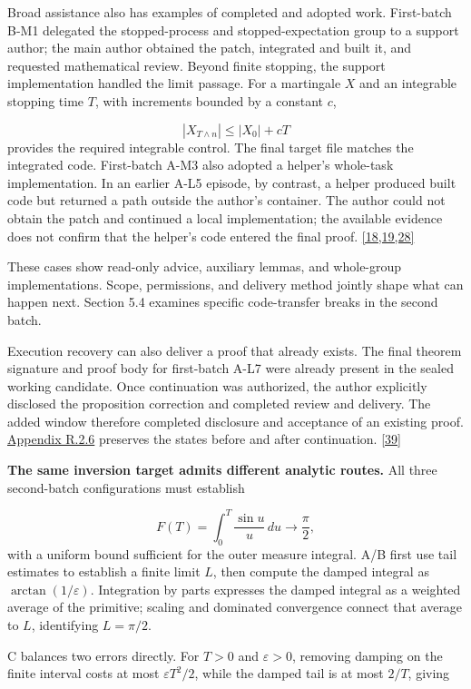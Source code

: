 Broad assistance also has examples of completed and adopted work. First-batch B-M1 delegated the stopped-process and stopped-expectation group to a support author; the main author obtained the patch, integrated and built it, and requested mathematical review. Beyond finite stopping, the support implementation handled the limit passage. For a martingale $X$ and an integrable stopping time $T$, with increments bounded by a constant $c$,

\[
|X_{T\wedge n}|\leq |X_0|+cT
\]
provides the required integrable control. The final target file matches the integrated code. First-batch A-M3 also adopted a helper's whole-task implementation. In an earlier A-L5 episode, by contrast, a helper produced built code but returned a path outside the author's container. The author could not obtain the patch and continued a local implementation; the available evidence does not confirm that the helper's code entered the final proof. \hyperlink{ref-18}{\mbox{[18,19,28]}}

These cases show read-only advice, auxiliary lemmas, and whole-group implementations. Scope, permissions, and delivery method jointly shape what can happen next. Section 5.4 examines specific code-transfer breaks in the second batch.

Execution recovery can also deliver a proof that already exists. The final theorem signature and proof body for first-batch A-L7 were already present in the sealed working candidate. Once continuation was authorized, the author explicitly disclosed the proposition correction and completed review and delivery. The added window therefore completed disclosure and acceptance of an existing proof. \href{en-appendix.pdf\#r2-6}{Appendix R.2.6} preserves the states before and after continuation. \hyperlink{ref-39}{\mbox{[39]}}

\textbf{The same inversion target admits different analytic routes.} All three second-batch configurations must establish

\[
F(T)=\int_0^T\frac{\sin u}{u}\,du\longrightarrow\frac\pi2,
\]
with a uniform bound sufficient for the outer measure integral. A/B first use tail estimates to establish a finite limit $L$, then compute the damped integral as $\arctan(1/\varepsilon)$. Integration by parts expresses the damped integral as a weighted average of the primitive; scaling and dominated convergence connect that average to $L$, identifying $L=\pi/2$.

C balances two errors directly. For $T>0$ and $\varepsilon>0$, removing damping on the finite interval costs at most $\varepsilon T^2/2$, while the damped tail is at most $2/T$, giving

